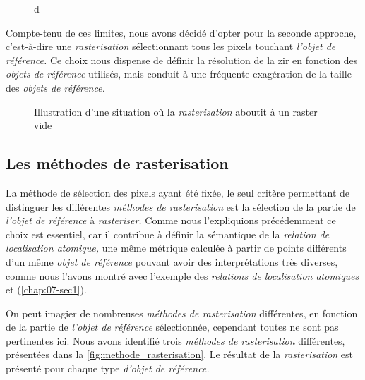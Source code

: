 \begin{figure}
  \centering
  
  \caption{d}
  \label{fig:rasterisation_sel_pixels}
\end{figure}

Compte-tenu de ces limites, nous avons décidé d'opter pour la seconde approche, c'est-à-dire une \emph{rasterisation} sélectionnant tous les pixels touchant \emph{l'objet de référence.} Ce choix nous dispense de définir la résolution de la \ac{zir} en fonction des \emph{objets de référence} utilisés, mais conduit à une fréquente exagération de la taille des \emph{objets de référence.}

\begin{wrapfigure}{r}{4cm}
  \centering
  
  \caption{Illustration d'une situation où la \emph{rasterisation}
    aboutit à un raster vide}
  \label{fig:rasterisation_cas_limite}
\end{wrapfigure}

\subsection{Les méthodes de rasterisation}

La méthode de sélection des pixels ayant été fixée, le seul critère permettant de distinguer les différentes \emph{méthodes de rasterisation} est la sélection de la partie de \emph{l'objet de référence} à \emph{rasteriser.} Comme nous l'expliquions précédemment ce choix est essentiel, car il contribue à définir la sémantique de la \emph{relation de localisation atomique,} une même métrique calculée à partir de points différents d'un même \emph{objet de référence} pouvant avoir des interprétations très diverses, comme nous l'avons montré avec l'exemple des \emph{relations de localisation atomiques}  et  (\autoref{chap:07-sec1}).

On peut imagier de nombreuses \emph{méthodes de rasterisation} différentes, en fonction de la partie de \emph{l'objet de référence} sélectionnée, cependant toutes ne sont pas pertinentes ici. Nous avons identifié trois \emph{méthodes de rasterisation} différentes, présentées dans la \ref{fig:methode_rasterisation}. Le résultat de la \emph{rasterisation} est présenté pour chaque type \emph{d'objet de référence.}


